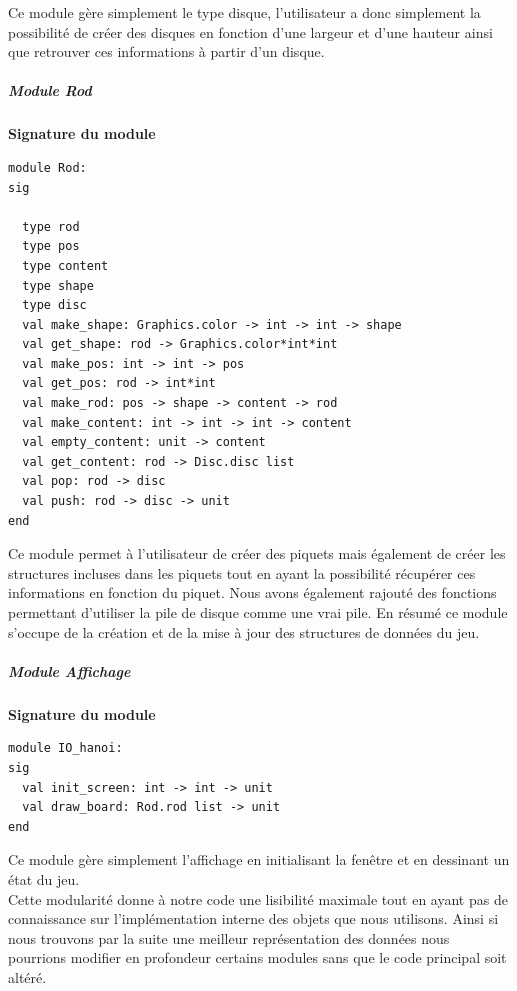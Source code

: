 \documentclass[a4paper,11pt]{article}
\begin{document}
Ce module gère simplement le type disque, l'utilisateur a donc simplement la possibilité de créer des disques en fonction d'une largeur et d'une hauteur ainsi que retrouver ces informations à partir d'un disque.

\subparagraph{Module Rod}
\begin{center}
\textbf{Signature du module}
\begin{lstlisting}
module Rod:
sig
  
  type rod
  type pos
  type content
  type shape
  type disc
  val make_shape: Graphics.color -> int -> int -> shape
  val get_shape: rod -> Graphics.color*int*int
  val make_pos: int -> int -> pos
  val get_pos: rod -> int*int
  val make_rod: pos -> shape -> content -> rod
  val make_content: int -> int -> int -> content
  val empty_content: unit -> content
  val get_content: rod -> Disc.disc list
  val pop: rod -> disc
  val push: rod -> disc -> unit    
end
\end{lstlisting}
\end{center}
Ce module permet à l'utilisateur de créer des piquets mais également de créer les structures incluses dans les piquets tout en ayant la possibilité récupérer ces informations en fonction du piquet.
Nous avons également rajouté des fonctions permettant d'utiliser la pile de disque comme une vrai pile.
En résumé ce module s'occupe de la création et de la mise à jour des structures de données du jeu.

\subparagraph{Module Affichage}
\begin{center}
\textbf{Signature du module}
\begin{lstlisting}
module IO_hanoi:
sig
  val init_screen: int -> int -> unit
  val draw_board: Rod.rod list -> unit
end
\end{lstlisting}
\end{center}
Ce module gère simplement l'affichage en initialisant la fenêtre et en dessinant un état du jeu.
\\
Cette modularité donne à notre code une lisibilité maximale tout en ayant pas de connaissance sur l'implémentation interne des objets que nous utilisons.
Ainsi si nous trouvons par la suite une meilleur représentation des données nous pourrions modifier en profondeur certains modules sans que le code principal soit altéré.
\end{document}

